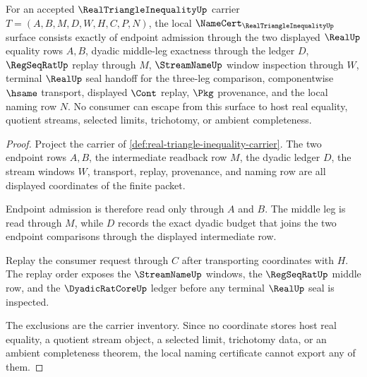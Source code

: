 \begin{theorem}
\label{thm:real-triangle-inequality-namecert}
For an accepted $\RealTriangleInequalityUp$ carrier $T=(A,B,M,D,W,H,C,P,N)$, the local $\NameCert_{\RealTriangleInequalityUp}$ surface consists exactly of endpoint admission through the two displayed $\RealUp$ equality rows $A,B$, dyadic middle-leg exactness through the ledger $D$, $\RegSeqRatUp$ replay through $M$, $\StreamNameUp$ window inspection through $W$, terminal $\RealUp$ seal handoff for the three-leg comparison, componentwise $\hsame$ transport, displayed $\Cont$ replay, $\Pkg$ provenance, and the local naming row $N$. No consumer can escape from this surface to host real equality, quotient streams, selected limits, trichotomy, or ambient completeness.
\end{theorem}
\begin{proof}
Project the carrier of \autoref{def:real-triangle-inequality-carrier}. The two endpoint rows $A,B$, the intermediate readback row $M$, the dyadic ledger $D$, the stream windows $W$, transport, replay, provenance, and naming row are all displayed coordinates of the finite packet.

Endpoint admission is therefore read only through $A$ and $B$. The middle leg is read through $M$, while $D$ records the exact dyadic budget that joins the two endpoint comparisons through the displayed intermediate row.

Replay the consumer request through $C$ after transporting coordinates with $H$. The replay order exposes the $\StreamNameUp$ windows, the $\RegSeqRatUp$ middle row, and the $\DyadicRatCoreUp$ ledger before any terminal $\RealUp$ seal is inspected.

The exclusions are the carrier inventory. Since no coordinate stores host real equality, a quotient stream object, a selected limit, trichotomy data, or an ambient completeness theorem, the local naming certificate cannot export any of them.
\end{proof}



